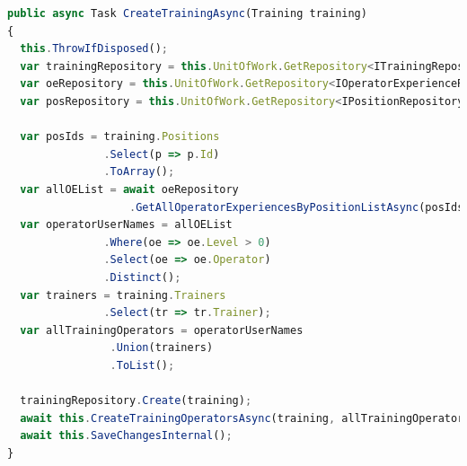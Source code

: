 \documentclass[11pt, oneside]{report}
\begin{document}
\begin{lstlisting}[language=Javascript,showstringspaces=false, caption= Implementácia managera na pridanie preškolenia,captionpos=b,label={lst:valfunkcia}]
public async Task CreateTrainingAsync(Training training)
{
  this.ThrowIfDisposed();
  var trainingRepository = this.UnitOfWork.GetRepository<ITrainingRepository>();
  var oeRepository = this.UnitOfWork.GetRepository<IOperatorExperienceRepository>();
  var posRepository = this.UnitOfWork.GetRepository<IPositionRepository>();

  var posIds = training.Positions
  			   .Select(p => p.Id)
  			   .ToArray();
  var allOEList = await oeRepository
  		           .GetAllOperatorExperiencesByPositionListAsync(posIds);
  var operatorUserNames = allOEList
  			   .Where(oe => oe.Level > 0)
  			   .Select(oe => oe.Operator)
  			   .Distinct();
  var trainers = training.Trainers
  			   .Select(tr => tr.Trainer);
  var allTrainingOperators = operatorUserNames
  			   	.Union(trainers)
  			   	.ToList();

  trainingRepository.Create(training);
  await this.CreateTrainingOperatorsAsync(training, allTrainingOperators);
  await this.SaveChangesInternal();
}
\end{lstlisting}
\end{document}
